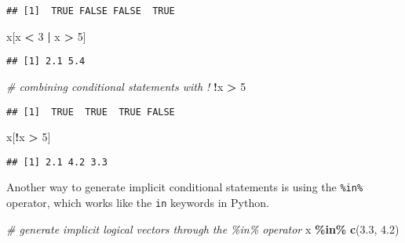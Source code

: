 \documentclass[
]{book}
\newenvironment{Shaded}{\begin{snugshade}}{\end{snugshade}}
\newcommand{\CommentTok}[1]{\textcolor[rgb]{0.56,0.35,0.01}{\textit{#1}}}
\newcommand{\DecValTok}[1]{\textcolor[rgb]{0.00,0.00,0.81}{#1}}
\newcommand{\FloatTok}[1]{\textcolor[rgb]{0.00,0.00,0.81}{#1}}
\newcommand{\KeywordTok}[1]{\textcolor[rgb]{0.13,0.29,0.53}{\textbf{#1}}}
\newcommand{\NormalTok}[1]{#1}
\newcommand{\OperatorTok}[1]{\textcolor[rgb]{0.81,0.36,0.00}{\textbf{#1}}}
\newcommand{\StringTok}[1]{\textcolor[rgb]{0.31,0.60,0.02}{#1}}
\begin{document}
\begin{verbatim}
## [1]  TRUE FALSE FALSE  TRUE
\end{verbatim}

\begin{Shaded}
\begin{Highlighting}[]
\NormalTok{x[x }\OperatorTok{\textless{}}\StringTok{ }\DecValTok{3} \OperatorTok{|}\StringTok{ }\NormalTok{x }\OperatorTok{\textgreater{}}\StringTok{ }\DecValTok{5}\NormalTok{]}
\end{Highlighting}
\end{Shaded}

\begin{verbatim}
## [1] 2.1 5.4
\end{verbatim}

\begin{Shaded}
\begin{Highlighting}[]
\CommentTok{\# combining conditional statements with !}
\OperatorTok{!}\NormalTok{x }\OperatorTok{\textgreater{}}\StringTok{ }\DecValTok{5}
\end{Highlighting}
\end{Shaded}

\begin{verbatim}
## [1]  TRUE  TRUE  TRUE FALSE
\end{verbatim}

\begin{Shaded}
\begin{Highlighting}[]
\NormalTok{x[}\OperatorTok{!}\NormalTok{x }\OperatorTok{\textgreater{}}\StringTok{ }\DecValTok{5}\NormalTok{]}
\end{Highlighting}
\end{Shaded}

\begin{verbatim}
## [1] 2.1 4.2 3.3
\end{verbatim}

Another way to generate implicit conditional statements is using the \texttt{\%in\%} operator, which works like the \texttt{in} keywords in Python.

\begin{Shaded}
\begin{Highlighting}[]
\CommentTok{\# generate implicit logical vectors through the \%in\% operator}
\NormalTok{x }\OperatorTok{\%in\%}\StringTok{ }\KeywordTok{c}\NormalTok{(}\FloatTok{3.3}\NormalTok{, }\FloatTok{4.2}\NormalTok{)}
\end{Highlighting}
\end{Shaded}
\end{document}
